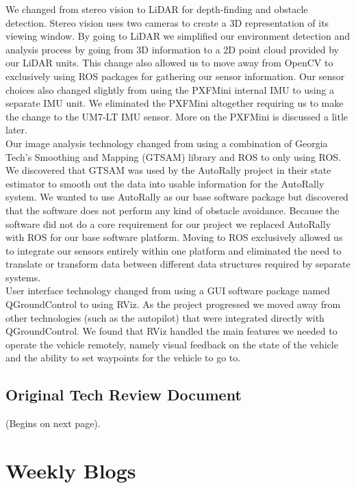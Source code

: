 \documentclass[compsoc,draftclsnofoot,onecolumn,10pt]{IEEEtran}
\begin{document}
We changed from stereo vision to LiDAR for depth-finding and obstacle detection. 
Stereo vision uses two cameras to create a 3D representation of its viewing window. 
By going to LiDAR we simplified our environment detection and analysis process by going from 3D information to a 2D point cloud provided by our LiDAR units. 
This change also allowed us to move away from OpenCV to exclusively using ROS packages for gathering our sensor information. 
Our sensor choices also changed slightly from using the PXFMini internal IMU to using a separate IMU unit. 
 We eliminated the PXFMini altogether requiring us to make the change to the UM7-LT IMU sensor. 
More on the PXFMini is discussed a litle later.\\

Our image analysis technology changed from using a combination of Georgia Tech's Smoothing and Mapping (GTSAM) library and ROS to only using ROS. 
We discovered that GTSAM was used by the AutoRally project in their state estimator to smooth out the data into usable information for the AutoRally system. 
We wanted to use AutoRally as our base software package but discovered that the software does not perform any kind of obstacle avoidance. 
Because the software did not do a core requirement for our project we replaced AutoRally with ROS for our base software platform. 
Moving to ROS exclusively allowed us to integrate our sensors entirely within one platform and eliminated the need to translate or transform data between different data structures required by separate systems.\\

User interface technology changed from using a GUI software package named QGroundControl to using RViz. 
As the project progressed we moved away from other technologies (such as the autopilot) that were integrated directly with QGroundControl. 
We found that RViz handled the main features we needed to operate the vehicle remotely, namely visual feedback on the state of the vehicle and the ability to set waypoints for the vehicle to go to.\\

\subsection{Original Tech Review Document}
(Begins on next page).


\clearpage
\section{Weekly Blogs}
\end{document}
